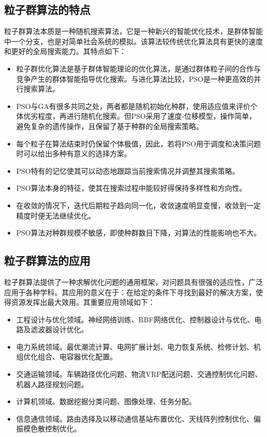 \subsection{粒子群算法的特点}
粒子群算法本质是一种随机搜索算法，它是一种新兴的智能优化技术，是群体智能中一个分支，也是对简单社会系统的模拟。该算法较传统优化算法具有更快的速度和更好的全局搜索能力。其特点如下：
\begin{itemize}
	\item 粒子群优化算法是基于群体智能理论的优化算法，是通过群体粒子间的合作与竞争产生的群体智能指导优化搜索。与进化算法比较，PSO是一种更高效的并行搜索算法。
	
	\item PSO与GA\cite{Han2000Mining}有很多共同之处，两者都是随机初始化种群，使用适应值来评价个体优劣程度，再进行随机化搜索。但PSO采用了速度-位移模型，操作简单，避免复杂的遗传操作，且保留了基于种群的全局搜索策略。
	
	\item 每个粒子在算法结束时仍保留个体极值，因此，若将PSO用于调度和决策问题时可以给出多种有意义的选择方案。
	
	\item PSO特有的记忆使其可以动态地跟踪当前搜索情况并调整其搜索策略。
	
	\item PSO算法本身的特征，使其在搜索过程中能较好得保持多样性和方向性。
	
	\item 在收敛的情况下，迭代后期粒子趋向同一化，收敛速度明显变慢，收敛到一定精度时便无法继续优化。
	
	\item PSO算法对种群规模不敏感，即使种群数目下降，对算法的性能影响也不大。
\end{itemize}
	
\subsection{粒子群算法的应用}
粒子群算法提供了一种求解优化问题的通用框架，对问题具有很强的适应性，广泛应用于各种学科。其应用的意义在于：在给定的条件下寻找到最好的解决方案，使得资源发挥出最大效用。其重要应用领域如下：
\begin{itemize}
	\item 工程设计与优化领域。神经网络训练、RBF网络优化、控制器设计与优化、电路及滤波器设计优化。
	\item 电力系统领域。最优潮流计算、电网扩展计划、电力恢复系统、检修计划、机组优化组合、电容器优化配置。
	\item 交通运输领域。车辆路径优化问题、物流VRP配送问题、交通控制优化问题、机器人路径规划问题。
	\item 计算机领域。数据挖掘分类问题、图像处理、任务分配。
	\item 信息通信领域。路由选择及以移动通信基站布置优化、天线阵列控制优化、偏振模色散控制优化。
\end{itemize}
 

